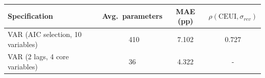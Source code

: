 \begin{tabular}{lccc}
\toprule
Specification & Avg.\ parameters & MAE (pp) & $\rho(\text{CEUI}, \sigma_{rev})$ \\
\midrule
VAR (AIC selection, 10 variables) & ~410 & 7.102 & 0.727 \\
VAR (2 lags, 4 core variables) & 36 & 4.322 & - \\
\bottomrule
\end{tabular}
